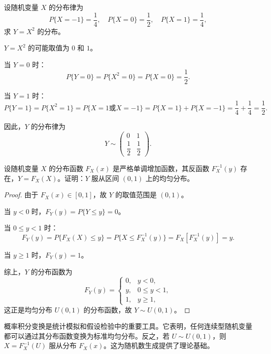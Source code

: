 \documentclass[lang=cn,11pt]{elegantbook}
\begin{document}
\begin{exercise}[离散型随机变量的函数] \label{exer:2-19}
设随机变量 $X$ 的分布律为
\[
P\{X=-1\} = \frac{1}{4},\quad P\{X=0\} = \frac{1}{2},\quad P\{X=1\} = \frac{1}{4},
\]
求 $Y = X^2$ 的分布。
\end{exercise}

\begin{solution}
$Y = X^2$ 的可能取值为 $0$ 和 $1$。

当 $Y=0$ 时：
\[
P\{Y=0\} = P\{X^2=0\} = P\{X=0\} = \frac{1}{2}.
\]

当 $Y=1$ 时：
\[
P\{Y=1\} = P\{X^2=1\} = P\{X=1 \text{或} X=-1\} = P\{X=1\} + P\{X=-1\} = \frac{1}{4} + \frac{1}{4} = \frac{1}{2}.
\]

因此，$Y$ 的分布律为
\[
Y \sim \begin{pmatrix} 0 & 1 \\[4pt] \dfrac{1}{2} & \dfrac{1}{2} \end{pmatrix}.
\]
\end{solution}

\begin{exercise}[概率积分变换] \label{exer:2-20}
设随机变量 $X$ 的分布函数 $F_X(x)$ 是严格单调增加函数，其反函数 $F_X^{-1}(y)$ 存在，$Y = F_X(X)$。证明：$Y$ 服从区间 $(0,1)$ 上的均匀分布。
\end{exercise}

\begin{proof}
由于 $F_X(x) \in [0,1]$，故 $Y$ 的取值范围是 $(0,1)$。

当 $y < 0$ 时，$F_Y(y) = P\{Y \le y\} = 0$。

当 $0 \le y < 1$ 时：
\[
F_Y(y) = P\{F_X(X) \le y\} = P\{X \le F_X^{-1}(y)\} = F_X[F_X^{-1}(y)] = y.
\]

当 $y \ge 1$ 时，$F_Y(y) = 1$。

综上，$Y$ 的分布函数为
\[
F_Y(y) = \begin{cases}
0, & y < 0, \\
y, & 0 \le y < 1, \\
1, & y \ge 1,
\end{cases}
\]
这正是均匀分布 $U(0,1)$ 的分布函数，故 $Y \sim U(0,1)$。
\end{proof}

\begin{remark}
概率积分变换是统计模拟和假设检验中的重要工具。它表明，任何连续型随机变量都可以通过其分布函数变换为标准均匀分布。反之，若 $U \sim U(0,1)$，则 $X = F_X^{-1}(U)$ 服从分布 $F_X(x)$。这为随机数生成提供了理论基础。
\end{remark}
\end{document}
